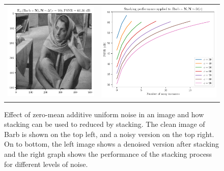 \documentclass{article}
\begin{document}
\begin{enumerate}
\begin{figure}
{\begin{tabular}{cc}
        \href{https://nbviewer.org/github/vicente-gonzalez-ruiz/denoising/blob/main/figs/averaging_denoising.ipynb\#denoised_0MAUN_barb}{\includegraphics{denoised_0MAUN_barb}} & \href{https://nbviewer.org/github/vicente-gonzalez-ruiz/denoising/blob/main/figs/averaging_denoising.ipynb\#PSNR_0MAUN_barb}{\includegraphics{PSNR_0MAUN_barb}}
      \end{tabular}
    }
    \caption{Effect of zero-mean additive uniform noise in an image
      and how stacking can be used to reduced by stacking. The clean
      image of Barb is shown on the top left, and a noisy version on
      the top right. On to bottom, the left image shows a denoised
      version after stacking and the right graph shows the performance
      of the stacking process for different levels of
      noise.\label{fig:0MAUN}}
  \end{figure}


\end{enumerate}
\end{document}

